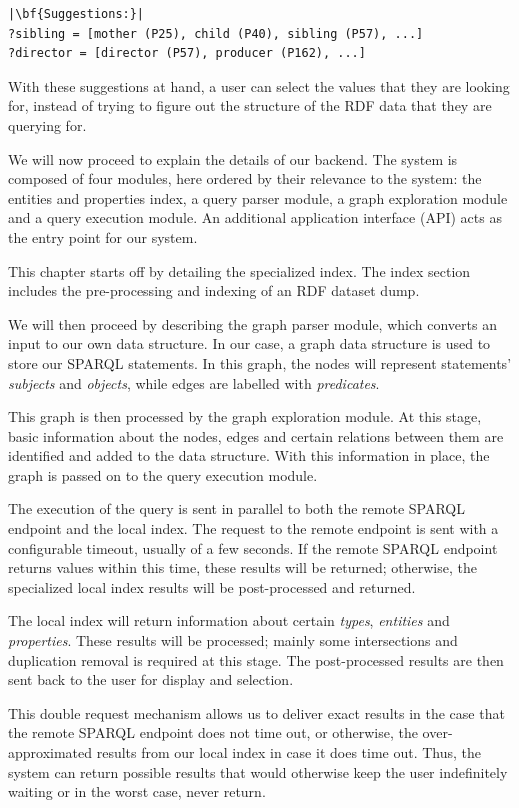 \begin{verbatim}
|\bf{Suggestions:}|
?sibling = [mother (P25), child (P40), sibling (P57), ...]
?director = [director (P57), producer (P162), ...]
\end{verbatim}

With these suggestions at hand, a user can select the values that they are looking for, instead of trying to figure out the structure of the RDF data that they are querying for.

We will now proceed to explain the details of our backend. The system is composed of four modules, here ordered by their relevance to the system: 
the entities and properties index,
a query parser module,
a graph exploration module and
a query execution module. 
An additional application interface (API) acts as the entry point for our system.

This chapter starts off by detailing the specialized index.
The index section includes the pre-processing and indexing of an RDF dataset dump.

We will then proceed by describing the graph parser module, which converts an input to our own data structure. 
In our case, a graph data structure is used to store our SPARQL statements. 
In this graph, the nodes will represent statements' \textit{subjects} and \textit{objects}, while edges are labelled with \textit{predicates}. 

This graph is then processed by the graph exploration module. 
At this stage, basic information about the nodes, edges and certain relations between them are identified and added to the data structure. 
With this information in place, the graph is passed on to the query execution module. 

The execution of the query is sent in parallel to both the remote SPARQL endpoint and the local index. 
The request to the remote endpoint is sent with a configurable timeout, usually of a few seconds. 
If the remote SPARQL endpoint returns values within this time, these results will be returned; otherwise, the specialized local index results will be post-processed and returned. 

The local index will return information about certain \textit{types}, \textit{entities} and \textit{properties}. 
These results will be processed; mainly some intersections and duplication removal is required at this stage.
The post-processed results are then sent back to the user for display and selection.

This double request mechanism allows us to deliver exact results in the case that the remote SPARQL endpoint does not time out, or otherwise, the over-approximated results from our local index in case it does time out. 
Thus, the system can return possible results that would otherwise keep the user indefinitely waiting or in the worst case, never return. 


